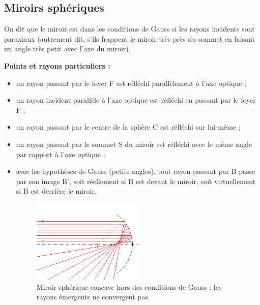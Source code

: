 \documentclass[a4paper,11pt]{article}
\begin{document}
\subsection{Miroirs sphériques}
\begin{defi}
On dit que le miroir est dans les conditions de Gauss si les rayons incidents sont paraxiaux (autrement dit, s'ils frappent le miroir très près du sommet en faisant un angle très petit avec l'axe du miroir).

\textbf{Points et rayons particuliers :}
\begin{itemize}
\item un rayon passant par le foyer F est réfléchi parallèlement à l'axe optique ;
\item un rayon incident parallèle à l'axe optique est réfléchi en passant par le foyer F ;
\item un rayon passant par le centre de la sphère C est réfléchi sur lui-même ;
\item un rayon passant par le sommet S du miroir est réfléchi avec le même angle par rapport à l'axe optique ;
\item avec les hypothèses de Gauss (petits angles), tout rayon passant par B passe par son image B', soit réellement si B est devant le miroir, soit virtuellement si B est derrière le miroir.
\begin{figure}[h]
  \caption{Miroir sphérique concave hors des conditions de Gauss : les rayons émergents ne convergent pas.}
  \centering
  \includegraphics[width=0.5\textwidth]{miroirspheriqueconc}
\end{figure}
\end{itemize}
\end{defi}
\end{document}
